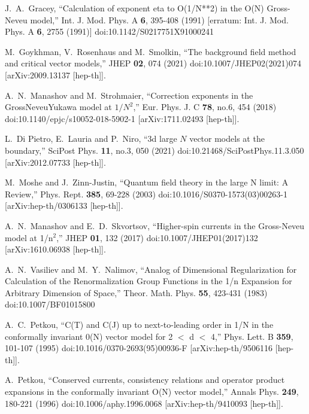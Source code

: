\documentclass[aps,amsmath,amssymb,prd,showpacs,floatfix,preprint,superscriptaddress,nofootinbib,12pt]{article}
\begin{document}
\begin{thebibliography}{99}
J.~A.~Gracey,
``Calculation of exponent eta to O(1/N**2) in the O(N) Gross-Neveu model,''
Int. J. Mod. Phys. A \textbf{6}, 395-408 (1991)
[erratum: Int. J. Mod. Phys. A \textbf{6}, 2755 (1991)]
doi:10.1142/S0217751X91000241

M.~Goykhman, V.~Rosenhaus and M.~Smolkin,
``The background field method and critical vector models,''
JHEP \textbf{02}, 074 (2021)
doi:10.1007/JHEP02(2021)074
[arXiv:2009.13137 [hep-th]].

A.~N.~Manashov and M.~Strohmaier,
``Correction exponents in the Gross\textendash{}Neveu\textendash{}Yukawa model at  $1/N^2$,''
Eur. Phys. J. C \textbf{78}, no.6, 454 (2018)
doi:10.1140/epjc/s10052-018-5902-1
[arXiv:1711.02493 [hep-th]].

L.~Di Pietro, E.~Lauria and P.~Niro,
``3d large $N$ vector models at the boundary,''
SciPost Phys. \textbf{11}, no.3, 050 (2021)
doi:10.21468/SciPostPhys.11.3.050
[arXiv:2012.07733 [hep-th]].

M.~Moshe and J.~Zinn-Justin,
``Quantum field theory in the large N limit: A Review,''
Phys. Rept. \textbf{385}, 69-228 (2003)
doi:10.1016/S0370-1573(03)00263-1
[arXiv:hep-th/0306133 [hep-th]].

A.~N.~Manashov and E.~D.~Skvortsov,
``Higher-spin currents in the Gross-Neveu model at 1/n$^{2}$,''
JHEP \textbf{01}, 132 (2017)
doi:10.1007/JHEP01(2017)132
[arXiv:1610.06938 [hep-th]].

A.~N.~Vasiliev and M.~Y.~Nalimov,
``Analog of Dimensional Regularization for Calculation of the Renormalization Group Functions in the 1/n Expansion for Arbitrary Dimension of Space,''
Theor. Math. Phys. \textbf{55}, 423-431 (1983)
doi:10.1007/BF01015800

A.~C.~Petkou,
``C(T) and C(J) up to next-to-leading order in 1/N in the conformally invariant 0(N) vector model for 2 \ensuremath{<} d \ensuremath{<} 4,''
Phys. Lett. B \textbf{359}, 101-107 (1995)
doi:10.1016/0370-2693(95)00936-F
[arXiv:hep-th/9506116 [hep-th]].

A.~Petkou,
``Conserved currents, consistency relations and operator product expansions in the conformally invariant O(N) vector model,''
Annals Phys. \textbf{249}, 180-221 (1996)
doi:10.1006/aphy.1996.0068
[arXiv:hep-th/9410093 [hep-th]].


\end{thebibliography}
\end{document}
